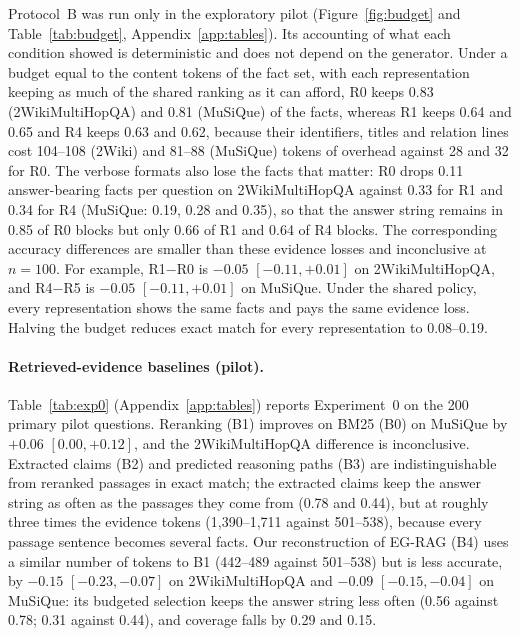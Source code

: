 Protocol~B was run only in the exploratory pilot (Figure~\ref{fig:budget} and Table~\ref{tab:budget}, Appendix~\ref{app:tables}). Its accounting of what each condition showed is deterministic and does not depend on the generator. Under a budget equal to the content tokens of the fact set, with each representation keeping as much of the shared ranking as it can afford, R0 keeps 0.83 (2WikiMultiHopQA) and 0.81 (MuSiQue) of the facts, whereas R1 keeps 0.64 and 0.65 and R4 keeps 0.63 and 0.62, because their identifiers, titles and relation lines cost 104--108 (2Wiki) and 81--88 (MuSiQue) tokens of overhead against 28 and 32 for R0. The verbose formats also lose the facts that matter: R0 drops 0.11 answer-bearing facts per question on 2WikiMultiHopQA against 0.33 for R1 and 0.34 for R4 (MuSiQue: 0.19, 0.28 and 0.35), so that the answer string remains in 0.85 of R0 blocks but only 0.66 of R1 and 0.64 of R4 blocks. The corresponding accuracy differences are smaller than these evidence losses and inconclusive at $n=100$. For example, R1$-$R0 is $-0.05$ $[-0.11, +0.01]$ on 2WikiMultiHopQA, and R4$-$R5 is $-0.05$ $[-0.11, +0.01]$ on MuSiQue. Under the shared policy, every representation shows the same facts and pays the same evidence loss. Halving the budget reduces exact match for every representation to 0.08--0.19.



\paragraph{Retrieved-evidence baselines (pilot).}

Table~\ref{tab:exp0} (Appendix~\ref{app:tables}) reports Experiment~0 on the 200 primary pilot questions. Reranking (B1) improves on BM25 (B0) on MuSiQue by $+0.06$ $[0.00, +0.12]$, and the 2WikiMultiHopQA difference is inconclusive. Extracted claims (B2) and predicted reasoning paths (B3) are indistinguishable from reranked passages in exact match; the extracted claims keep the answer string as often as the passages they come from (0.78 and 0.44), but at roughly three times the evidence tokens (1{,}390--1{,}711 against 501--538), because every passage sentence becomes several facts. Our reconstruction of EG-RAG (B4) uses a similar number of tokens to B1 (442--489 against 501--538) but is less accurate, by $-0.15$ $[-0.23, -0.07]$ on 2WikiMultiHopQA and $-0.09$ $[-0.15, -0.04]$ on MuSiQue: its budgeted selection keeps the answer string less often (0.56 against 0.78; 0.31 against 0.44), and coverage falls by 0.29 and 0.15.


